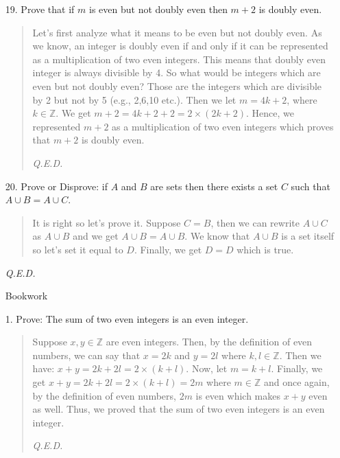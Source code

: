 \documentclass[12pt, a4paper]{article}                      %
\begin{document}
\begin{enumerate}
\item[19.]
Prove that if $m$ is even but not doubly even then $m + 2$ is doubly even.
\begin{quote}
Let's first analyze what it means to be even but not doubly even. As we know, an integer
is doubly even if and only if it can be represented as a multiplication of two even integers.
This means that doubly even integer is always divisible by 4. So what would be integers which are even
but not doubly even? Those are the integers which are divisible by 2 but not by 5 (e.g., 2,6,10 etc.).
Then we let $m = 4k + 2$, where $k \in \mathbb{Z}$. We get $m + 2 = 4k + 2 + 2 = 2 \times (2k + 2)$.
Hence, we represented $m + 2$ as a multiplication of two even integers which proves that $m + 2$ is
doubly even.
\begin{flushright}
\textit{Q.E.D.}
\end{flushright}
\end{quote}

\item[20.]
Prove or Disprove: if $A$ and $B$ are sets then there exists a set $C$ such that $A \cup B = A \cup C$.
\begin{quote}
It is right so let's prove it.
Suppose $C = B$, then we can rewrite $A \cup C$ as $A \cup B$ and we get $A \cup B = A \cup B$.
We know that $A \cup B$ is a set itself so let's set it equal to $D$. Finally, we get $D = D$ which
is true.
\end{quote}
\begin{flushright}
\textit{Q.E.D.}
\end{flushright}

\newpage
{\Large Bookwork}
\item[1.]
Prove: The sum of two even integers is an even integer.
\begin{quote}
Suppose $x, y \in \mathbb{Z}$ are even integers. Then, by the definition of even
numbers, we can say that $x = 2k$ and $y = 2l$ where $k, l \in \mathbb{Z}$.
Then we have: $x + y = 2k + 2l = 2 \times (k + l)$. Now, let $m = k + l$.
Finally, we get $x + y = 2k + 2l = 2 \times (k + l) = 2m$ where $m \in \mathbb{Z}$
and once again, by the definition of even numbers, $2m$ is even which makes $x + y$ even as well.
Thus, we proved that the sum of two even integers is an even integer.
\begin{flushright}
\textit{Q.E.D.}
\end{flushright}
\end{quote}


\end{enumerate}
\end{document}
